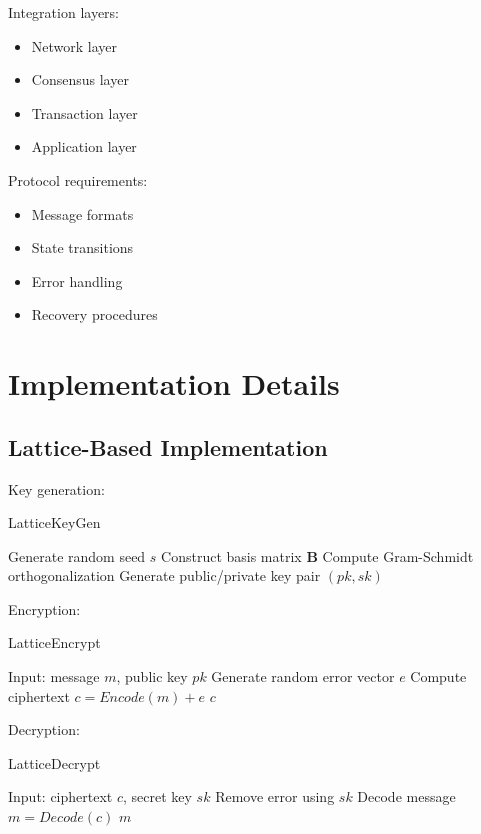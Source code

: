 \documentclass[12pt]{article}
\begin{document}
Integration layers:
\begin{itemize}
\item Network layer
\item Consensus layer
\item Transaction layer
\item Application layer
\end{itemize}

Protocol requirements:
\begin{itemize}
\item Message formats
\item State transitions
\item Error handling
\item Recovery procedures
\end{itemize}

\section{Implementation Details}

\subsection{Lattice-Based Implementation}

Key generation:

\begin{algorithm}
\caption{LatticeKeyGen}
\begin{algorithmic}[1]
\STATE Generate random seed $s$
\STATE Construct basis matrix $\mathbf{B}$
\STATE Compute Gram-Schmidt orthogonalization
\STATE Generate public/private key pair
\RETURN $(pk, sk)$
\end{algorithmic}
\end{algorithm}

Encryption:

\begin{algorithm}
\caption{LatticeEncrypt}
\begin{algorithmic}[1]
\STATE Input: message $m$, public key $pk$
\STATE Generate random error vector $e$
\STATE Compute ciphertext $c = Encode(m) + e$
\RETURN $c$
\end{algorithmic}
\end{algorithm}

Decryption:

\begin{algorithm}
\caption{LatticeDecrypt}
\begin{algorithmic}[1]
\STATE Input: ciphertext $c$, secret key $sk$
\STATE Remove error using $sk$
\STATE Decode message $m = Decode(c)$
\RETURN $m$
\end{algorithmic}
\end{algorithm}
\end{document}
